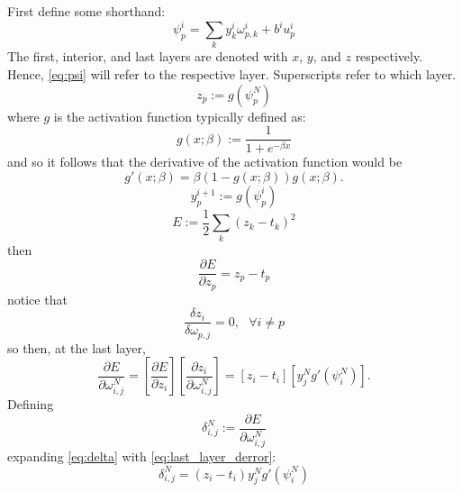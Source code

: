\documentclass{article}
\begin{document}
First define some shorthand:
\begin{equation} \label{eq:psi}
\psi^i_p = \sum_{k} y_k^i \omega_{p,k}^i + b^iu_p^i
\end{equation}
%
The first, interior, and last layers are denoted with $x$, $y$, and $z$ respectively. Hence, \eqref{eq:psi} will refer to the respective layer. Superscripts refer to which layer.
%
\begin{equation} \label{eq:z}
z_p := g(\psi_p^N)
\end{equation}
%
where $g$ is the activation function typically defined as:
%
\begin{equation} \label{eq:g}
g(x;\beta) := \frac{1}{1 + e^{-\beta x}}
\end{equation}
%
and so it follows that the derivative of the activation function would be
%
\begin{equation} \label{eq:gp}
g'(x;\beta) = \beta \left( 1 - g(x;\beta) \right) g(x; \beta).
\end{equation}
%
\begin{equation} \label{eq:z}
y_p^{i+1} := g(\psi_p^i)
\end{equation}
%
\begin{equation} \label{eq:error}
E := \frac{1}{2} \sum_k (z_k - t_k)^2
\end{equation}
%
then
%
\begin{equation} \label{eq:derror}
\frac{\partial E}{\partial z_p} = z_p - t_p
\end{equation}
%
notice that
%
\begin{equation} \label{eq:last_layer_derror_eq_0}
\frac{\delta z_i}{\delta \omega_{p,j}} = 0, \ \ \ \forall i \neq p
\end{equation}
%
so then, at the last layer,
%
\begin{equation} \label{eq:last_layer_derror}
\frac{\partial E}{\partial \omega_{i,j}^N} =
\left[ \frac{\partial E}{\partial z_i} \right] \left[ \frac{\partial z_i}{\partial \omega_{i, j}^N} \right] =
\left[ z_i - t_i \right] \left[ y_j^N g' (\psi_i^N) \right].
\end{equation}
%
Defining
%
\begin{equation} \label{eq:delta}
\delta_{i,j}^N := \frac{\partial E}{\partial \omega_{i,j}^N}
\end{equation}
%
expanding \eqref{eq:delta} with \eqref{eq:last_layer_derror}:
%
\begin{equation} \label{eq:delta_full}
\delta_{i,j}^N = 
\left ( z_i - t_i \right ) y_j^N g' (\psi_i^N)
\end{equation}
\end{document}
